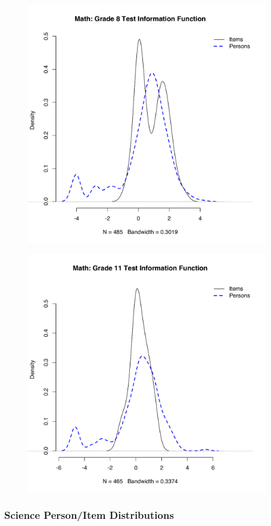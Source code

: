 \documentclass[]{article}
\begin{document}
\begin{figure}
\centering
\includegraphics[height=4.16667in]{ipdens/math8ipdens.pdf}
\caption{}
\end{figure}

\begin{figure}
\centering
\includegraphics[height=4.16667in]{ipdens/math11ipdens.pdf}
\caption{}
\end{figure}

\subsubsection{Science Person/Item
Distributions}\label{science-personitem-distributions}
\end{document}
